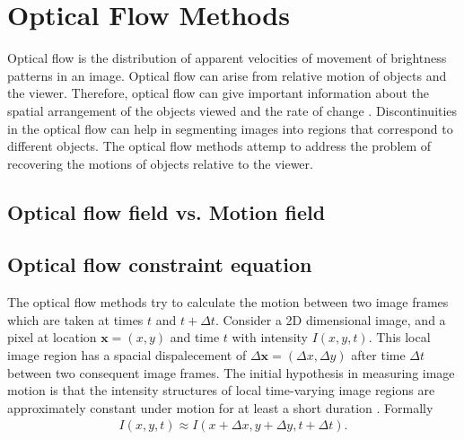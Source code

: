 \documentclass[letterpaper,12pt]{article}
\begin{document}
\newpage



\section{Optical Flow Methods}
\label{sec:optical-flow}
Optical flow is the distribution of apparent velocities of movement of brightness patterns in an image. Optical flow can arise from relative motion of
objects and the viewer. Therefore, optical flow can give important information about the spatial arrangement of the objects viewed and the rate of change \citep{Horn:Schunck:1981}. Discontinuities in the optical flow can help in segmenting images into regions that correspond to different objects. The optical flow methods attemp to address the problem of recovering the motions of objects relative to the viewer. 
\subsection{Optical flow field vs. Motion field}

\subsection{Optical flow constraint equation}
The optical flow methods try to calculate the motion between two image frames which are taken at times $t$ and $t + \Delta t$. Consider a 2D dimensional image, and a pixel at location $\mathbf{x} = (x,y)$ and time $t$ with intensity $I(x,y,t)$. This local image region has a spacial dispalecement of $\Delta \mathbf{x} = (\Delta x, \Delta y)$ after time $\Delta t$ between two consequent image frames. The initial hypothesis in measuring image motion is that the intensity structures of local time-varying image regions are approximately constant under motion for at least a short duration \citep{Beauchemin:1995,Horn:Schunck:1981}. Formally
\begin{align}
I(x,y,t) \approx I(x + \Delta x, y + \Delta y, t + \Delta t).
\label{eq:intensity-cond}
\end{align}
\end{document}
